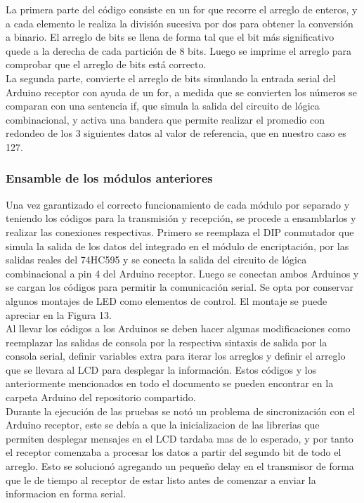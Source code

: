 \documentclass{article}
\begin{document}
La primera parte del código consiste en un for que recorre el arreglo de enteros, y a cada elemento le realiza la división sucesiva por dos para obtener la conversión a binario. El arreglo de bits se llena de forma tal que el bit más significativo quede a la derecha de cada partición de 8 bits.
Luego se imprime el arreglo para comprobar que el arreglo de bits está correcto.\\

La segunda parte, convierte el arreglo de bits simulando la entrada serial del Arduino receptor con ayuda de un for, a medida que se convierten los números se comparan con una sentencia if, que simula la salida del circuito de lógica combinacional, y activa una bandera que permite realizar el promedio con redondeo de los 3 siguientes datos al valor de referencia, que en nuestro caso es 127.

\subsubsection{Ensamble de los módulos anteriores}
Una vez garantizado el correcto funcionamiento de cada módulo por separado y teniendo los códigos para la transmisión y recepción, se procede a ensamblarlos y realizar las conexiones respectivas. Primero se reemplaza el DIP conmutador que simula la salida de los datos del integrado en el módulo de encriptación, por las salidas reales del 74HC595 y se conecta la salida del circuito de lógica combinacional a pin 4 del Arduino receptor. Luego se conectan ambos Arduinos y se cargan los códigos para permitir la comunicación serial. Se opta por conservar algunos montajes de LED como elementos de control. El montaje se puede apreciar en la Figura 13.\\

Al llevar los códigos a los Arduinos se deben hacer algunas modificaciones como reemplazar las salidas de consola por la respectiva sintaxis de salida por la consola serial, definir variables extra para iterar los arreglos y definir el arreglo que se llevara al LCD para desplegar la información. Estos códigos y los anteriormente mencionados en todo el documento se pueden encontrar en la carpeta Arduino del repositorio compartido.\\

Durante la ejecución de las pruebas se notó un problema de sincronización con el Arduino receptor, este se debía a que la inicializacion de las librerias que permiten desplegar mensajes en el LCD tardaba mas de lo esperado, y por tanto el receptor comenzaba a procesar los datos a partir del segundo bit de todo el arreglo. Esto se solucionó agregando un pequeño delay en el transmisor de forma que le de tiempo al receptor de estar listo antes de comenzar a enviar la informacion en forma serial.\\
\end{document}
